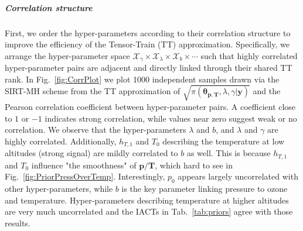 \subparagraph{Correlation structure}
First, we order the hyper-parameters according to their correlation structure to improve the efficiency of the Tensor-Train (TT) approximation. 
Specifically, we arrange the hyper-parameter space $\mathcal{X}_{\gamma} \times \mathcal{X}_{\lambda} \times \mathcal{X}_{b} \times \cdots$ such that highly correlated hyper-parameter pairs are adjacent and directly linked through their shared TT rank.
In Fig.~\ref{fig:CorrPlot} we plot 1000 independent samples drawn via the SIRT-MH scheme from the TT approximation of $\sqrt{\pi( \bm{\theta}_{\bm{p}, \bm{T}},\lambda,\gamma  | \bm{y})}$ and the Pearson correlation coefficient between hyper-parameter pairs.
A coefficient close to $1$ or $-1$ indicates strong correlation, while values near zero suggest weak or no correlation.
We observe that the hyper-parameters $\lambda$ and $b$, and $\lambda$ and $\gamma$ are highly correlated.
Additionally, $h_{T,1}$ and $T_0$ describing the temperature at low altitudes (strong signal) are mildly correlated to $b$ as well.
This is because $h_{T,1}$ and $T_0$ influence "the smoothness" of $\bm{p}/\bm{T}$, which hard to see in Fig.~\ref{fig:PriorPressOverTemp}.
Interestingly, $p_0$ appears largely uncorrelated with other hyper-parameters, while $b$ is the key parameter linking pressure to ozone and temperature.
Hyper-parameters describing temperature at higher altitudes are very much uncorrelated and the IACTs in Tab.~\ref{tab:priors} agree with those results.


